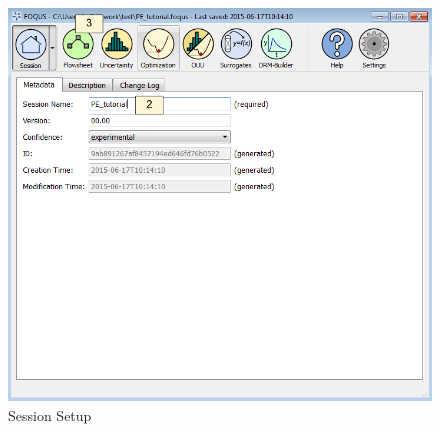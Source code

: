 \begin{figure}[H]
	\begin{center}
		\includegraphics[scale=0.55]{Chapt_optimization/figs/par_est_tut1}
		\caption{Session Setup}
		\label{fig.pe.tut1}
	\end{center}
\end{figure}

